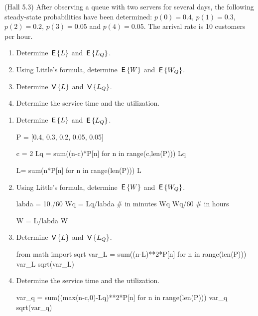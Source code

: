 \begin{exercise}(Hall 5.3) After observing a queue with two servers
  for several days, the following steady-state probabilities have been
  determined: $p(0)=0.4$, $p(1) = 0.3$, $p(2)=0.2$, $p(3)=0.05$ and
  $p(4)=0.05$. The arrival rate is 10 customers per hour.
  \begin{enumerate}
  \item Determine $\,\mathsf{E}\left\{L\right\}$ and  $\,\mathsf{E}\left\{L_Q\right\}$. 
  \item Using Little's formula, determine $\,\mathsf{E}\left\{W\right\}$ and $\,\mathsf{E}\left\{W_Q\right\}$. 
  \item Determine $\,\mathsf{V}\left\{L\right\}$ and $\,\mathsf{V}\left\{L_Q\right\}$.
  \item Determine the service time and the utilization.
  \end{enumerate}
  \begin{solution}
    \begin{enumerate}
    \item Determine $\,\mathsf{E}\left\{L\right\}$ and  $\,\mathsf{E}\left\{L_Q\right\}$. 

\begin{pyconsole}
P = [0.4, 0.3, 0.2, 0.05, 0.05]

c = 2
Lq = sum((n-c)*P[n] for n in range(c,len(P)))
Lq

L= sum(n*P[n] for n in range(len(P)))
L
\end{pyconsole}

\item Using Little's formula, determine $\,\mathsf{E}\left\{W\right\}$ and $\,\mathsf{E}\left\{W_Q\right\}$. 
\begin{pyconsole}
labda = 10./60
Wq = Lq/labda # in minutes
Wq
Wq/60 # in hours

W = L/labda
W
\end{pyconsole} 

\item Determine $\,\mathsf{V}\left\{L\right\}$ and $\,\mathsf{V}\left\{L_Q\right\}$.
\begin{pyconsole}
from math import sqrt
var_L = sum((n-L)**2*P[n] for n in range(len(P)))
var_L
sqrt(var_L)
\end{pyconsole} 

\item Determine the service time and the utilization.
\begin{pyconsole}
var_q = sum((max(n-c,0)-Lq)**2*P[n] for n in range(len(P)))
var_q
sqrt(var_q)
\end{pyconsole}

  \end{enumerate}
    \end{solution}
\end{exercise}  

